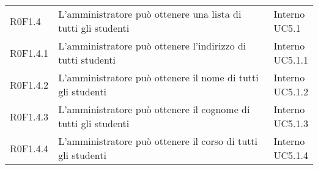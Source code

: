 \documentclass[AnalisiDeiRequisiti.tex]{subfiles}
\begin{document}
\begin{longtable}[H]{p{2cm}p{5.2cm}p{5cm}}
	R0F1.4 & L'amministratore può ottenere una lista di tutti gli studenti & \makecell[tl]{
		Interno \\
		UC5.1
	} \\
	R0F1.4.1 & L'amministratore può ottenere l'indirizzo di tutti studenti & \makecell[tl]{
		Interno \\
		UC5.1.1
	} \\
	R0F1.4.2 & L'amministratore può ottenere il nome di tutti gli studenti & \makecell[tl]{
		Interno \\
		UC5.1.2
	} \\
	R0F1.4.3 & L'amministratore può ottenere il cognome di tutti gli studenti & \makecell[tl]{
		Interno \\
		UC5.1.3
	} \\
	R0F1.4.4  & L'amministratore può ottenere il corso di tutti gli studenti & \makecell[tl]{
		Interno \\
		UC5.1.4
	} \\


\end{longtable}
\end{document}
